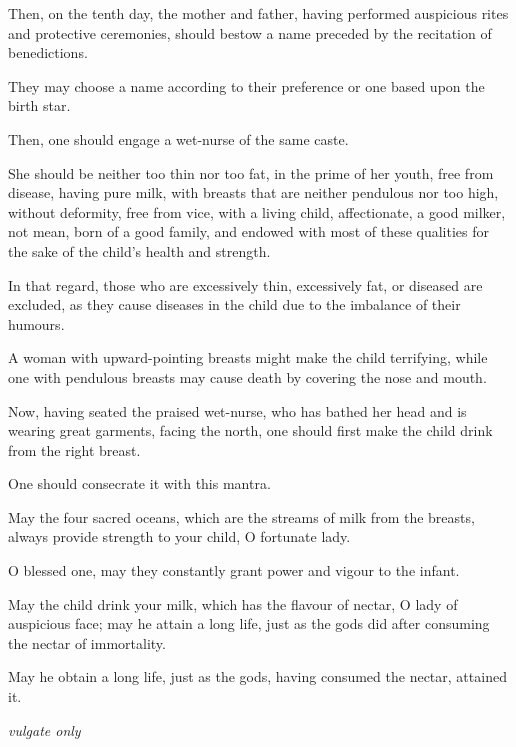 \begin{translation}
\begin{tt}
\item[24]

Then, on the tenth day, the mother and father, having performed
auspicious rites and protective ceremonies, should bestow a name
preceded by the recitation of benedictions.

They may choose a name according to their preference or one based upon
the birth star.

\item[25]

Then, one should engage a wet-nurse of the same caste.

She should be neither too thin nor too fat, in the prime of her youth,
free from disease, having pure milk, with breasts that are neither
pendulous nor too high, without deformity, free from vice, with a living
child, affectionate, a good milker, not mean, born of a good family, and
endowed with most of these qualities for the sake of the
child's health and strength.

In that regard, those who are excessively thin, excessively fat, or
diseased are excluded, as they cause diseases in the child due to the
imbalance of their humours.

A woman with upward-pointing breasts might make the child terrifying,
while one with pendulous breasts may cause death by covering the nose
and mouth.

Now, having seated the praised wet-nurse, who has bathed her head and is
wearing great garments, facing the north, one should first make the
child drink from the right breast.

One should consecrate it with this mantra.

\item[26]

May the four sacred oceans, which are the streams of milk from the
breasts, always provide strength to your child, O fortunate lady.

O blessed one, may they constantly grant power and vigour to the
infant.

\item[27]

May the child drink your milk, which has the flavour of nectar, O lady
of auspicious face; may he attain a long life, just as the gods did
after consuming the nectar of immortality.

May he obtain a long life, just as the gods, having consumed the nectar,
attained it.

\item[28--30] \emph{vulgate only}


\end{tt}
\end{translation}
